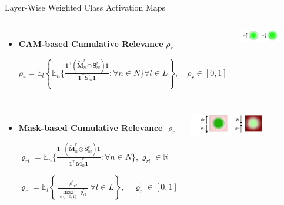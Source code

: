 \documentclass[aspectratio=169]{beamer}
\begin{document}
\begin{frame}{Layer-Wise Weighted Class Activation Maps}
\fontsize{10}{18}\selectfont


\begin{columns}

    

    \begin{itemize}
        \item \textbf{CAM-based Cumulative Relevance} $\rho_r$
    
    $\rho_r = \mathbb{E}_{l}\left\{\mathbb{E}_{n}\Biggl\{  \frac{ \mathbf{1}^\top (\tilde{\mathbf{M}}^r_n \odot \mathbf{S}^r_{nl}) \mathbf{1}}{\mathbf{1}^\top \mathbf{S}^r_{nl} \mathbf{1}} : \forall n\in N\Biggl\}\forall l\in L\right\} , \quad \rho_r\in [0,1]$ 
    \end{itemize}

    \includegraphics[trim={0.95cm 0 0 0},clip,width=0.65\textwidth]{Figures/rho_measure.pdf}

\end{columns}


\begin{columns}

    \begin{itemize}
        \item \textbf{Mask-based Cumulative Relevance $\varrho_r$}

    $\varrho^{'}_{rl} =  \mathbb{E}_{n}\Biggl\{ \frac{ \mathbf{1}^\top (\tilde{\mathbf{M}}^r_n \odot \mathbf{S}^r_{nl}) \mathbf{1}}{\mathbf{1}^\top \tilde{\mathbf{M}}^r_n \mathbf{1}} : \forall n\in N\Biggl\}, \varrho_{rl}\in\mathbb{R}^+$ 
    
    $\varrho_r = \mathbb{E}_{l}\left\{ \frac{{\varrho^{'}}_{rl}}{{\max\limits_{c \in \{0,1\}} \varrho^{'}_{cl}}} \forall l\in L\right\}, \quad \varrho^{'}_r\in [0,1]$  
    \end{itemize}
    

    \includegraphics[trim={1.1cm 0 0 0},clip,width=0.65\textwidth]{Figures/varrho_measure.pdf}
    

\end{columns}
\end{frame}
\end{document}
